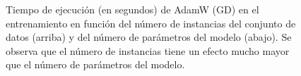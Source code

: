 \begin{figure}
    \centering
    \hfill
    \caption[Representación gráfica del tiempo de ejecución de AdamW en función del número de parámetros del modelo]{Tiempo de ejecución (en segundos) de AdamW (GD) en el entrenamiento en función del número de instancias del conjunto de datos (arriba) y del número de parámetros del modelo (abajo). Se observa que el número de instancias tiene un efecto mucho mayor que el número de parámetros del modelo.}
    \label{fig:tiemposgraf}
\end{figure}





